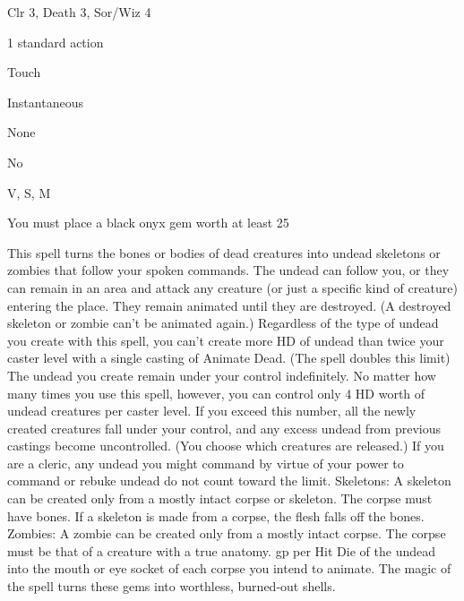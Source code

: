 
\begin{description*}
\item[Level:] Clr 3, Death 3, Sor/Wiz 4
\item[Casting Time:] 1 standard action
\item[Range:] Touch
\item[Duration:] Instantaneous
\item[Saving Throw:] None
\item[Spell Resistance:] No
\item[Components:] V, S, M
\item[Arcane Material Component:] You must place a black onyx gem worth at least 25
\end{description*}

This spell turns the bones or bodies of dead creatures into undead skeletons or
zombies that follow your spoken commands.
The undead can follow you, or they can remain in an area and attack any creature
(or just a specific kind of creature) entering the place. They remain animated
until they are destroyed. (A destroyed skeleton or zombie can't be animated again.)
Regardless of the type of undead you create with this spell, you can't create more
HD of undead than twice your caster level with a single casting of Animate Dead. (The  spell doubles this limit)
The undead you create remain under your control indefinitely. No matter how many
times you use this spell, however, you can control only 4 HD worth of undead creatures
per caster level. If you exceed this number, all the newly created creatures fall
under your control, and any excess undead from previous castings become uncontrolled.
(You choose which creatures are released.) If you are a cleric, any undead you
might command by virtue of your power to command or rebuke undead do not count
toward the limit.
Skeletons: A skeleton can be created only from a mostly intact corpse
or skeleton. The corpse must have bones. If a skeleton is made from a corpse, the
flesh falls off the bones.
Zombies: A zombie can be created only from a mostly intact corpse. The
corpse must be that of a creature with a true anatomy.
gp per Hit Die of the undead into the mouth or eye socket of each corpse you intend
to animate. The magic of the spell turns these gems into worthless, burned-out
shells.